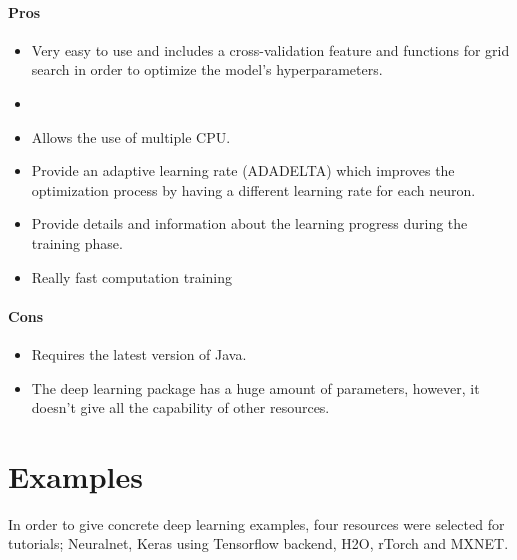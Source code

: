 \documentclass[letter]{article}\usepackage[]{graphicx}\usepackage[]{color}
\makeatletter
\newenvironment{kframe}{%
 \def\at@end@of@kframe{}%
 \ifinner\ifhmode%
  \def\at@end@of@kframe{\end{minipage}}%
  \begin{minipage}{\columnwidth}%
 \fi\fi%
 \def\FrameCommand##1{\hskip\@totalleftmargin \hskip-\fboxsep
 \colorbox{shadecolor}{##1}\hskip-\fboxsep
     \hskip-\linewidth \hskip-\@totalleftmargin \hskip\columnwidth}%
 \MakeFramed {\advance\hsize-\width
   \@totalleftmargin\z@ \linewidth\hsize
   \@setminipage}}%
 {\par\unskip\endMakeFramed%
 \at@end@of@kframe}
\newenvironment{knitrout}{}{} %
\makeatother
\begin{document}
\paragraph{Pros}
\begin{itemize}
\item Very easy to use and includes a cross-validation feature and functions for grid search in order to optimize the model's hyperparameters.
\item 
\item Allows the use of multiple CPU.
\item Provide an adaptive learning rate (ADADELTA) which improves the optimization process by having a different learning rate for each neuron.
\item Provide details and information about the learning progress during the training phase.
\item Really fast computation training
\end{itemize}
\paragraph{Cons}
\begin{itemize}
\item Requires the latest version of Java.
\item The deep learning package has a huge amount of parameters, however, it doesn't give all the capability of other resources.
\end{itemize}

\section{Examples}
\begin{knitrout}
\color{fgcolor}\begin{kframe}


{\ttfamily\noindent\color{warningcolor}{\#\# Warning in readChar(con, 5L, useBytes = TRUE): cannot open compressed file 'C:/Users/adrie/OneDrive/Desktop/Git/Deep\_learning\_r/DeepLearninginR/FNN\_save.RData', probable reason 'No such file or directory'}}

{\ttfamily\noindent\bfseries\color{errorcolor}{\#\# Error in readChar(con, 5L, useBytes = TRUE): cannot open the connection}}\end{kframe}
\end{knitrout}
\label{sec:examples}
In order to give concrete deep learning examples, four resources were selected for tutorials; Neuralnet, Keras using Tensorflow backend, H2O, rTorch and MXNET.
\end{document}
